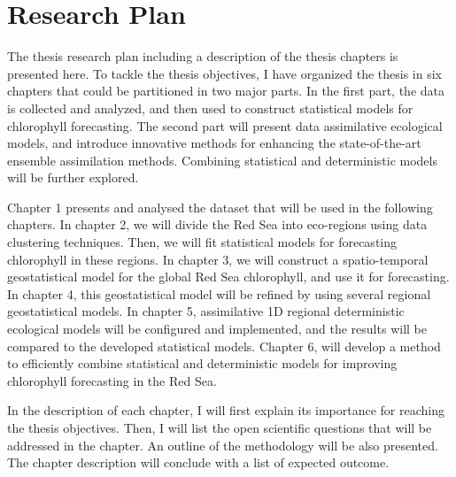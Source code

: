 \chapter{Research Plan}

The thesis research plan including a description of the thesis chapters is
presented here. To tackle the thesis objectives, I have organized the thesis in
six chapters that could be partitioned in two major parts. In the first part,
the data is collected and analyzed, and then used to construct statistical
models for chlorophyll forecasting. The second part will present data
assimilative ecological models, and introduce innovative methods for enhancing
the state-of-the-art ensemble assimilation methods. Combining statistical and
deterministic models will be further explored.

Chapter 1 presents and analysed the dataset that will be used in the following
chapters.  In chapter 2, we will divide the Red Sea into eco-regions using data
clustering techniques. Then, we will fit statistical models for forecasting
chlorophyll in these regions. In chapter 3, we will construct a spatio-temporal
geostatistical model for the global Red Sea chlorophyll, and use it for
forecasting. In chapter 4, this geostatistical model will be refined by using
several regional geostatistical models. In chapter 5, assimilative 1D regional
deterministic ecological models will be configured and implemented, and the
results will be compared to the developed statistical models.  Chapter 6, will
develop a method to efficiently combine statistical and deterministic models
for improving chlorophyll forecasting in the Red Sea.

In the description of each chapter, I will first explain its importance for
reaching the thesis objectives. Then, I will list the open scientific questions
that will be addressed in the chapter. An outline of the methodology will be
also presented. The chapter description will conclude with a list of expected
outcome.
